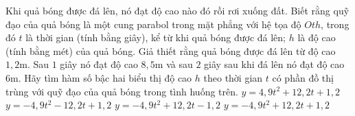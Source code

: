 

\begin{ex}%
	Khi quả bóng được đá lên, nó đạt độ cao nào đó rồi rơi xuống đất. Biết rằng quỹ đạo của quả bóng là một cung parabol trong mặt phẳng với hệ tọa độ $Oth$, trong đó $t$ là thời gian (tính bằng giây), kể từ khi quả bóng được đá lên; $h$ là độ cao (tính bằng mét) của quả bóng. Giả thiết rằng quả bóng được đá lên từ độ cao $1{,}2$m. Sau $1$ giây nó đạt độ cao $8{,}5$m và sau $2$ giây sau khi đá lên nó đạt độ cao $6$m. Hãy tìm hàm số bậc hai biểu thị độ cao $h$ theo thời gian $t$ có phần đồ thị trùng với quỹ đạo của  quả bóng trong tình huống trên.
	 \choice
		 {$y=4{,}9t^2+12{,}2t+1{,}2$}
		 {$y=-4{,}9t^2-12{,}2t+1{,}2$}
		{$y=-4{,}9t^2+12{,}2t-1{,}2$} 
		{\True $y=-4{,}9t^2+12{,}2t+1{,}2$} 
\end{ex}



